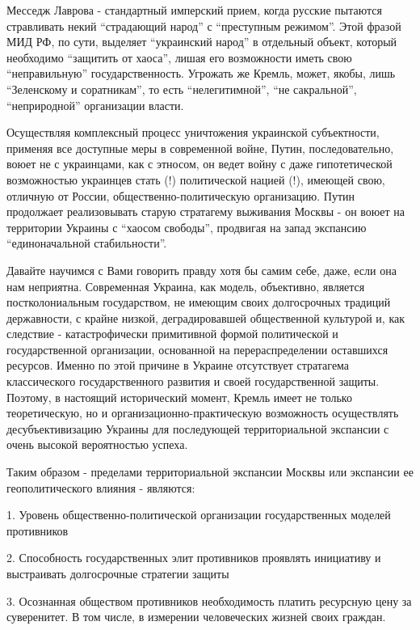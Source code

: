 Месседж Лаврова - стандартный имперский прием, когда русские пытаются
стравливать некий \enquote{страдающий народ} с \enquote{преступным режимом}.
Этой фразой МИД РФ, по сути, выделяет \enquote{украинский народ} в отдельный
объект, который необходимо \enquote{защитить от хаоса}, лишая его возможности
иметь свою \enquote{неправильную} государственность. Угрожать же Кремль, может,
якобы, лишь \enquote{Зеленскому и соратникам}, то есть \enquote{нелегитимной},
\enquote{не сакральной}, \enquote{неприродной} организации власти.

Осуществляя комплексный процесс уничтожения украинской субъектности, применяя
все доступные меры в современной войне, Путин, последовательно, воюет не с
украинцами, как с этносом, он ведет войну с даже гипотетической возможностью
украинцев стать (!) политической нацией (!), имеющей свою, отличную от России,
общественно-политическую организацию. Путин продолжает реализовывать старую
стратагему выживания Москвы - он воюет на территории Украины с \enquote{хаосом
свободы}, продвигая на запад экспансию \enquote{единоначальной стабильности}.

Давайте научимся с Вами говорить правду хотя бы самим себе, даже, если она нам
неприятна. Современная Украина, как модель, объективно, является
постколониальным государством, не имеющим своих долгосрочных традиций
державности, с крайне низкой, деградировавшей общественной культурой и, как
следствие - катастрофически примитивной формой политической и государственной
организации, основанной на перераспределении оставшихся ресурсов. Именно по
этой причине в Украине отсутствует стратагема классического государственного
развития и своей государственной защиты. Поэтому, в настоящий исторический
момент, Кремль имеет не только теоретическую, но и организационно-практическую
возможность осуществлять десубъективизацию Украины для последующей
территориальной экспансии с очень высокой вероятностью успеха.

Таким образом - пределами территориальной экспансии Москвы или экспансии ее
геополитического влияния - являются:

1. Уровень общественно-политической организации государственных моделей
противников

2. Способность государственных элит противников проявлять инициативу и
выстраивать долгосрочные стратегии защиты

3. Осознанная обществом противников необходимость платить ресурсную цену за
суверенитет. В том числе, в измерении человеческих жизней своих граждан.

